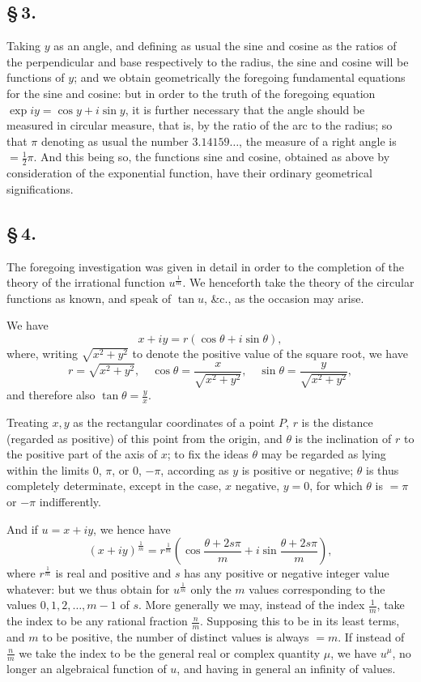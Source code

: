 \documentclass[11pt,a4paper]{book}
\begin{document}
\subsection*{\S\,3.}

Taking $y$ as an angle, and defining as usual the sine and cosine as the ratios of the perpendicular and base respectively to the radius, the sine and cosine will be functions of $y$; and we obtain geometrically the foregoing fundamental equations for the sine and cosine: but in order to the truth of the foregoing equation $\exp iy = \cos y + i\sin y$, it is further necessary that the angle should be measured in circular measure, that is, by the ratio of the arc to the radius; so that $\pi$ denoting as usual the number $3.14159\ldots$, the measure of a right angle is $= \frac{1}{2}\pi$. And this being so, the functions sine and cosine, obtained as above by consideration of the exponential function, have their ordinary geometrical significations.

\subsection*{\S\,4.}

The foregoing investigation was given in detail in order to the completion of the theory of the irrational function $u^{\frac{1}{m}}$. We henceforth take the theory of the circular functions as known, and speak of $\tan u$, \&c., as the occasion may arise.

We have
\[
x + iy = r(\cos\theta + i\sin\theta),
\]
where, writing $\sqrt{x^{2} + y^{2}}$ to denote the positive value of the square root, we have
\[
r = \sqrt{x^{2} + y^{2}}, \quad \cos\theta = \frac{x}{\sqrt{x^{2} + y^{2}}}, \quad \sin\theta = \frac{y}{\sqrt{x^{2} + y^{2}}},
\]
and therefore also $\tan\theta = \frac{y}{x}$.

Treating $x, y$ as the rectangular coordinates of a point $P$, $r$ is the distance (regarded as positive) of this point from the origin, and $\theta$ is the inclination of $r$ to the positive part of the axis of $x$; to fix the ideas $\theta$ may be regarded as lying within the limits $0$, $\pi$, or $0$, $-\pi$, according as $y$ is positive or negative; $\theta$ is thus completely determinate, except in the case, $x$ negative, $y = 0$, for which $\theta$ is $= \pi$ or $-\pi$ indifferently.

And if $u = x + iy$, we hence have
\[
(x + iy)^{\frac{1}{m}} = r^{\frac{1}{m}}\left(\cos\frac{\theta + 2s\pi}{m} + i\sin\frac{\theta + 2s\pi}{m}\right),
\]
where $r^{\frac{1}{m}}$ is real and positive and $s$ has any positive or negative integer value whatever: but we thus obtain for $u^{\frac{1}{m}}$ only the $m$ values corresponding to the values $0, 1, 2, \ldots, m - 1$ of $s$. More generally we may, instead of the index $\frac{1}{m}$, take the index to be any rational fraction $\frac{n}{m}$. Supposing this to be in its least terms, and $m$ to be positive, the number of distinct values is always $= m$. If instead of $\frac{n}{m}$ we take the index to be the general real or complex quantity $\mu$, we have $u^{\mu}$, no longer an algebraical function of $u$, and having in general an infinity of values.
\end{document}
